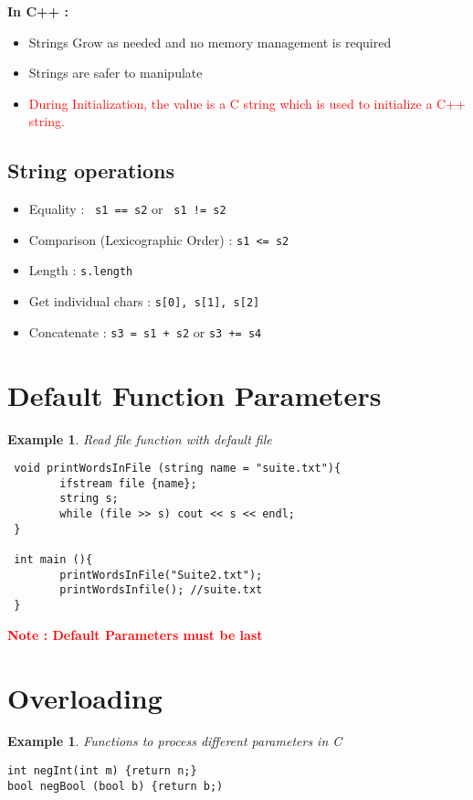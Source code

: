 \documentclass{article}
\newtheorem{ex}[theorem]{Example}
\begin{document}
 \textbf{In C++ :}
 \begin{itemize}
 \item Strings Grow as needed and no memory management is required
 \item Strings are safer to manipulate
 \item \textcolor{red}{During Initialization, the value is a C string which is used to initialize a C++ string.} 
 \end{itemize}
 
 \subsection{String operations}
 \begin{itemize}
 \item Equality : \verb| s1 == s2| or \verb| s1 != s2|
 \item Comparison (Lexicographic Order) : \verb|s1 <= s2|
 \item Length : \verb|s.length|
 \item Get individual chars : \verb|s[0], s[1], s[2]|
 \item Concatenate : \verb|s3 = s1 + s2| or \verb|s3 += s4|
 \end{itemize}
 
 \section{Default Function Parameters}
 
 \begin{ex} Read file function with default file 
 \begin{lstlisting}
 void printWordsInFile (string name = "suite.txt"){
 		ifstream file {name};
 		string s;
 		while (file >> s) cout << s << endl;
 }
 
 int main (){
 		printWordsInFile("Suite2.txt");
 		printWordsInfile(); //suite.txt
 }
 \end{lstlisting}
 \end{ex}
 
 
\textbf{\textcolor{red}{Note : Default Parameters must be last}}

\section{Overloading}
\begin{ex} Functions to process different parameters in C
\begin{lstlisting} 
int negInt(int m) {return n;}
bool negBool (bool b) {return b;)
\end{lstlisting}
\end{ex}
\end{document}
